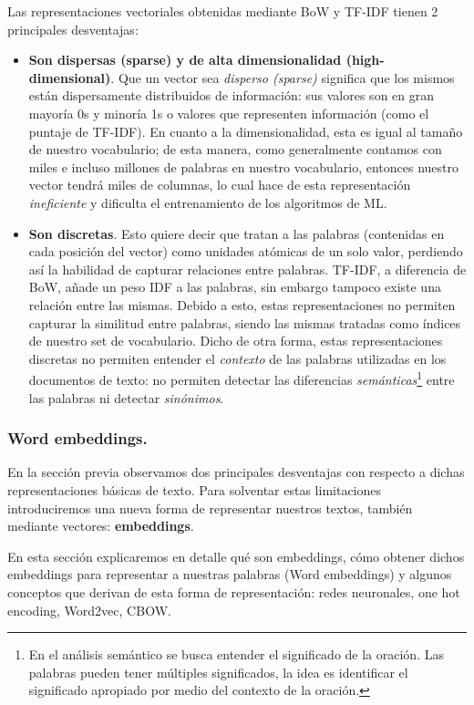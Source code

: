 \documentclass[12pt,a4paper]{article}
\begin{document}
\begin{sloppypar}
Las representaciones vectoriales obtenidas mediante BoW y TF-IDF tienen 2 principales desventajas\cite{NLP_26, NLP_2}: 
\begin{itemize}
\item \textbf{Son dispersas (sparse) y de alta dimensionalidad (high-dimensional)}. Que un vector sea \textit{disperso (sparse)} significa que los mismos están dispersamente distribuidos de información: sus valores son en gran mayoría 0s y minoría 1s o valores que representen información (como el puntaje de TF-IDF). En cuanto a la dimensionalidad, esta es igual al tamaño de nuestro vocabulario; de esta manera, como generalmente contamos con miles e incluso millones de palabras en nuestro vocabulario, entonces nuestro vector tendrá miles de columnas, lo cual hace de esta representación \textit{ineficiente} y dificulta el entrenamiento de los algoritmos de ML. 
\item \textbf{Son discretas}. Esto quiere decir que tratan a las palabras (contenidas en cada posición del vector) como unidades atómicas de un solo valor, perdiendo así la habilidad de capturar relaciones entre palabras. TF-IDF, a diferencia de BoW, añade un peso IDF a las palabras, sin embargo tampoco existe una relación entre las mismas. Debido a esto, estas representaciones no permiten capturar la similitud entre palabras, siendo las mismas tratadas como índices de nuestro set de vocabulario. Dicho de otra forma, estas representaciones discretas no permiten entender el \textit{contexto} de las palabras utilizadas en los documentos de texto: no permiten detectar las diferencias \textit{semánticas}\footnote{En el análisis semántico se busca entender el significado de la oración. Las palabras pueden tener múltiples significados, la idea es identificar el significado apropiado por medio del contexto de la oración.} entre las palabras ni detectar \textit{sinónimos}. 
\end{itemize}

\cleardoublepage

\subsubsection{Word embeddings.}\label{word_emb}
En la sección previa observamos dos principales desventajas con respecto a dichas representaciones básicas de texto. Para solventar estas limitaciones introduciremos una nueva forma de representar nuestros textos, también mediante vectores: \textbf{embeddings}. 

En esta sección explicaremos en detalle qué son embeddings, cómo obtener dichos embeddings para representar a nuestras palabras (Word embeddings) y algunos conceptos que derivan de esta forma de representación: redes neuronales, one hot encoding, Word2vec, CBOW.


\end{sloppypar}
\end{document}
